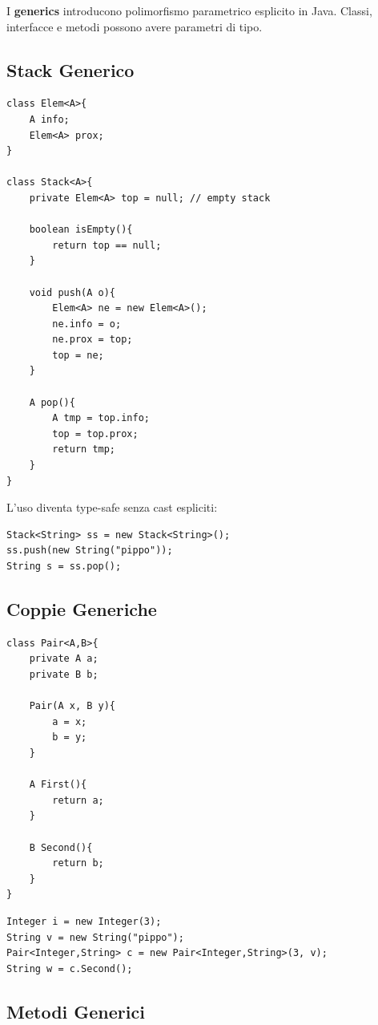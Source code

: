 \documentclass{article}
\begin{document}
I \textbf{generics} introducono polimorfismo parametrico esplicito in Java. Classi, interfacce e metodi possono avere parametri di tipo.

\subsection{Stack Generico}

\begin{lstlisting}
class Elem<A>{
    A info;
    Elem<A> prox;
}

class Stack<A>{
    private Elem<A> top = null; // empty stack

    boolean isEmpty(){
        return top == null;
    }

    void push(A o){
        Elem<A> ne = new Elem<A>();
        ne.info = o;
        ne.prox = top;
        top = ne;
    }

    A pop(){
        A tmp = top.info;
        top = top.prox;
        return tmp;
    }
}
\end{lstlisting}

L'uso diventa type-safe senza cast espliciti:

\begin{lstlisting}
Stack<String> ss = new Stack<String>();
ss.push(new String("pippo"));
String s = ss.pop();
\end{lstlisting}

\subsection{Coppie Generiche}

\begin{lstlisting}
class Pair<A,B>{
    private A a;
    private B b;

    Pair(A x, B y){
        a = x;
        b = y;
    }

    A First(){
        return a;
    }

    B Second(){
        return b;
    }
}
\end{lstlisting}

\begin{lstlisting}
Integer i = new Integer(3);
String v = new String("pippo");
Pair<Integer,String> c = new Pair<Integer,String>(3, v);
String w = c.Second();
\end{lstlisting}

\subsection{Metodi Generici}
\end{document}
